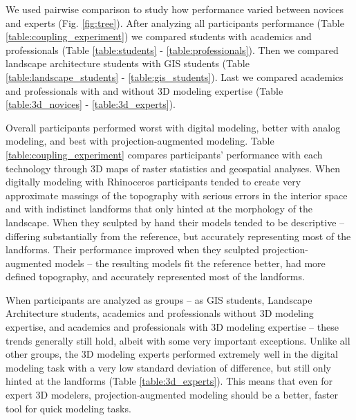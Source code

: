 \documentclass[prodmode,acmtochi]{acmsmall} %
\begin{document}



We used pairwise comparison to study 
how performance varied between 
novices and experts (Fig. \ref{fig:tree}).
%
After analyzing all participants performance 
(Table \ref{table:coupling_experiment})
we compared students with academics and professionals 
(Table \ref{table:students} - \ref{table:professionals}). 
Then we compared landscape architecture students with GIS students
(Table \ref{table:landscape_students} - \ref{table:gis_students}).
Last we compared academics and professionals 
with and without 3D modeling expertise (Table \ref{table:3d_novices} - \ref{table:3d_experts}).


Overall participants performed 
worst with digital modeling, 
better with analog modeling, 
and best with projection-augmented modeling.
%
Table \ref{table:coupling_experiment} 
compares participants' performance with each technology
through 3D maps of raster statistics 
and geospatial analyses.
%
When digitally modeling with Rhinoceros 
participants tended to 
create very approximate massings of the topography
with serious errors in the interior space and
with indistinct landforms
that only hinted at the morphology of the landscape.
%
When they sculpted by hand
their models tended to be descriptive -- 
differing substantially from the reference, but
accurately representing most of the landforms. 
%
Their performance improved 
when they sculpted projection-augmented models --
the resulting models
fit the reference better, 
had more defined topography, 
and accurately represented most of the landforms.


When participants are analyzed as groups 
-- as GIS students, Landscape Architecture students, 
academics and professionals without 3D modeling expertise, 
and academics and professionals with 3D modeling expertise -- 
these trends generally still hold, 
albeit with some very important exceptions.
%
Unlike all other groups, 
the 3D modeling experts performed extremely well 
in the digital modeling task
with a very low standard deviation of difference, 
but still only hinted at the landforms 
(Table \ref{table:3d_experts}). 
%
This means that even for expert 3D modelers,
projection-augmented modeling 
should be a better, faster tool 
for quick modeling tasks. 
\end{document}
